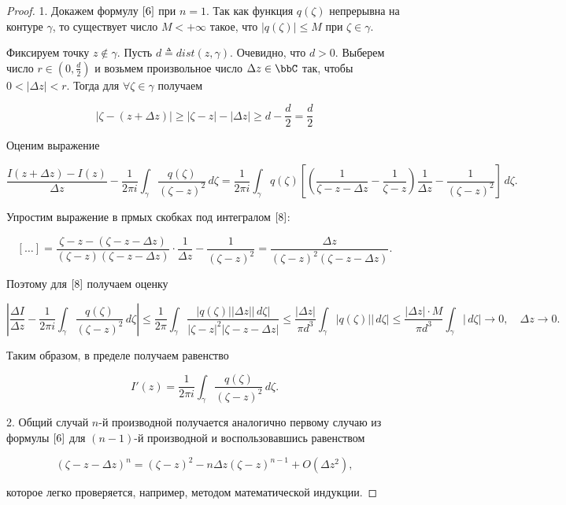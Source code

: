 \begin{proof}
1. Докажем формулу $\eqref{6}$ при $n = 1$. Так как функция $q(\zeta)$ непрерывна на контуре $\gamma$, то существует число $M < + \infty$ такое, что $|q(\zeta)| \le M$ при $\zeta \in \gamma$.

Фиксируем точку $z \notin \gamma$. Пусть $d \triangleq dist(z, \gamma)$. Очевидно, что $d > 0$. Выберем число $r \in (0, \frac{d}{2})$ и возьмем произвольное число $\Delta z \in \bbC$ так, чтобы $0 < |\Delta z| < r$. Тогда для $\forall \zeta \in \gamma$ получаем

\begin{equation} \label{7}
|\zeta - (z + \Delta z)| \ge |\zeta - z| - |\Delta z| \ge d - \frac{d}{2} = \frac{d}{2}
\end{equation}

Оценим выражение

\begin{equation} \label{8}
\frac{I(z + \Delta z) - I(z)}{\Delta z} - \frac{1}{2 \pi i} \int_\gamma \frac{q(\zeta)}{(\zeta - z)^2}\,d\zeta = \frac{1}{2 \pi i} \int_\gamma q(\zeta) \left[ \left( \frac{1}{\zeta - z - \Delta z} - \frac{1}{\zeta - z} \right) \frac{1}{\Delta z} - \frac{1}{(\zeta - z)^2} \right] \,d\zeta.
\end{equation}

Упростим выражение в прмых скобках под интегралом $\eqref{8}$:

$$
[\ldots] = \frac{\zeta - z - (\zeta - z - \Delta z)}{(\zeta - z)(\zeta - z - \Delta z)} \cdot \frac{1}{\Delta z} - \frac{1}{(\zeta - z)^2} = \frac{\Delta z}{(\zeta - z)^2 (\zeta - z - \Delta z)} .
$$

Поэтому для $\eqref{8}$ получаем оценку 

$$
\left| \frac{\Delta I}{\Delta z} - \frac{1}{2\pi i} \int_\gamma \frac{q(\zeta)}{(\zeta - z)^2}\,d\zeta \right| 
\le \frac{1}{2\pi} \int_\gamma \frac{|q(\zeta)||\Delta z||\,d\zeta|}{|\zeta - z|^2|\zeta - z - \Delta z|}
\le \frac{|\Delta z|}{\pi d^3} \int_\gamma |q(\zeta)||\,d\zeta| 
\le \frac{|\Delta z| \cdot M}{\pi d^3} \int_\gamma |\,d\zeta| \to 0, \quad \Delta z \to 0.
$$

Таким образом, в пределе получаем равенство

\begin{equation} \label{9}
I'(z) = \frac{1}{2\pi i} \int_\gamma \frac{q(\zeta)}{(\zeta - z)^2} \,d\zeta.
\end{equation}

2. Общий случай $n$-й производной получается аналогично первому случаю из формулы $\eqref{6}$ для 
$(n - 1)$-й производной и воспользовавшись равенством

$$
(\zeta - z - \Delta z)^n = (\zeta - z)^2 - n \Delta z (\zeta - z)^{n - 1} + O(\Delta z^2),
$$

которое легко проверяется, например, методом математической индукции.

\end{proof}

